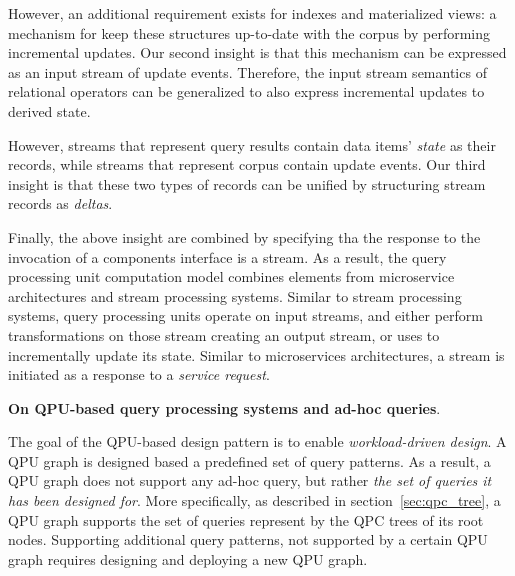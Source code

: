 However, an additional requirement exists for indexes and materialized views:
a mechanism for keep these structures up-to-date with the corpus by performing incremental updates.
Our second insight is that this mechanism can be expressed as an input stream of update events.
Therefore, the input stream semantics of relational operators can be generalized to also express incremental updates to derived state.

However, streams that represent query results contain data items' \textit{state} as their records,
while streams that represent corpus contain update events.
Our third insight is that these two types of records can be unified by structuring stream records as
\textit{deltas}.

Finally, the above insight are combined by specifying tha the response to the invocation of a components interface is a stream.
As a result, the query processing unit computation model combines elements from microservice architectures and stream processing systems.
Similar to stream processing systems,
query processing units operate on input streams, and either perform transformations on those stream creating an output
stream, or uses to incrementally update its state.
Similar to microservices architectures, a stream is initiated as a response to a \textit{service request}.

\medskip
\noindent
\textbf{On QPU-based query processing systems and ad-hoc queries}.

\noindent
The goal of the QPU-based design pattern is to enable \textit{workload-driven design}.
A QPU graph is designed based a predefined set of query patterns.
As a result, a QPU graph does not support any ad-hoc query,
but rather \textit{the set of queries it has been designed for}.
More specifically, as described in section~\ref{sec:qpc_tree}, a QPU graph supports the set of queries represent by the QPC trees of its root nodes.
Supporting additional query patterns, not supported by a certain QPU graph requires designing and deploying a
new QPU graph.


